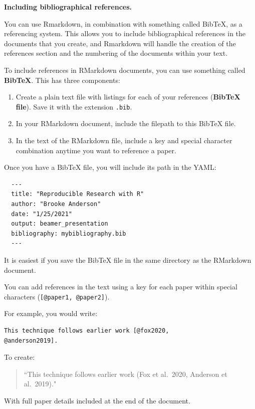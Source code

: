 \documentclass[]{tufte-book}
\providecommand{\tightlist}{%
  \setlength{\itemsep}{0pt}\setlength{\parskip}{0pt}}
\begin{document}
\textbf{Including bibliographical references.}

You can use Rmarkdown, in combination with something called BibTeX, as a
referencing system. This allows you to include bibliographical references in the
documents that you create, and Rmarkdown will handle the creation of the
references section and the numbering of the documents within your text.

To include references in RMarkdown documents, you can use something called
\textbf{BibTeX}. This has three components:

\begin{enumerate}
\def\labelenumi{\arabic{enumi}.}
\tightlist
\item
  Create a plain text file with listings for each of
  your references (\textbf{BibTeX file}). Save it with the
  extension \texttt{.bib}.
\item
  In your RMarkdown document, include the filepath
  to this BibTeX file.
\item
  In the text of the RMarkdown file, include a key and special character
  combination anytime you want to reference a paper.
\end{enumerate}

Once you have a BibTeX file, you will include its
path in the YAML:

\begin{verbatim}
  ---
  title: "Reproducible Research with R"
  author: "Brooke Anderson"
  date: "1/25/2021"
  output: beamer_presentation
  bibliography: mybibliography.bib
  ---
\end{verbatim}

It is easiest if you save the BibTeX file in the same directory
as the RMarkdown document.

You can add references in the text using a key for each paper
within special characters (\texttt{{[}@paper1,\ @paper2{]}}).

For example, you would write:

\begin{verbatim}
This technique follows earlier work [@fox2020, 
@anderson2019].
\end{verbatim}

To create:

\begin{quote}
``This technique follows earlier work (Fox et al.~2020, Anderson et al.~2019)."
\end{quote}

With full paper details included at the end of the document.
\end{document}
